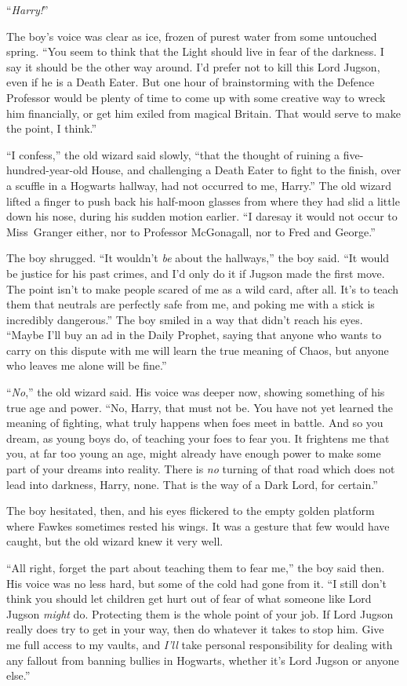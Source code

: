 “\emph{Harry!}”

The boy’s voice was clear as ice, frozen of purest water from some untouched
spring. “You seem to think that the Light should live in fear of the darkness.
I say it should be the other way around. I’d prefer not to kill this Lord
Jugson, even if he is a Death Eater. But one hour of brainstorming with the
Defence Professor would be plenty of time to come up with some creative way to
wreck him financially, or get him exiled from magical Britain. That would serve
to make the point, I think.”

“I confess,” the old wizard said slowly, “that the thought of ruining a
five-hundred-year-old House, and challenging a Death Eater to fight to the
finish, over a scuffle in a Hogwarts hallway, had not occurred to me, Harry.”
The old wizard lifted a finger to push back his half-moon glasses from where
they had slid a little down his nose, during his sudden motion earlier. “I
daresay it would not occur to Miss~Granger either, nor to Professor McGonagall,
nor to Fred and George.”

The boy shrugged. “It wouldn’t \emph{be} about the hallways,” the boy said. “It
would be justice for his past crimes, and I’d only do it if Jugson made the
first move. The point isn’t to make people scared of me as a wild card, after
all. It’s to teach them that neutrals are perfectly safe from me, and poking me
with a stick is incredibly dangerous.” The boy smiled in a way that didn’t
reach his eyes. “Maybe I’ll buy an ad in the Daily Prophet, saying that anyone
who wants to carry on this dispute with me will learn the true meaning of
Chaos, but anyone who leaves me alone will be fine.”

“\emph{No},” the old wizard said. His voice was deeper now, showing something
of his true age and power. “No, Harry, that must not be. You have not yet
learned the meaning of fighting, what truly happens when foes meet in battle.
And so you dream, as young boys do, of teaching your foes to fear you. It
frightens me that you, at far too young an age, might already have enough power
to make some part of your dreams into reality. There is \emph{no} turning of
that road which does not lead into darkness, Harry, none. That is the way of a
Dark Lord, for certain.”

The boy hesitated, then, and his eyes flickered to the empty golden platform
where Fawkes sometimes rested his wings. It was a gesture that few would have
caught, but the old wizard knew it very well.

“All right, forget the part about teaching them to fear me,” the boy said then.
His voice was no less hard, but some of the cold had gone from it. “I still
don’t think you should let children get hurt out of fear of what someone like
Lord Jugson \emph{might} do. Protecting them is the whole point of your job. If
Lord Jugson really does try to get in your way, then do whatever it takes to
stop him. Give me full access to my vaults, and \emph{I’ll} take personal
responsibility for dealing with any fallout from banning bullies in Hogwarts,
whether it’s Lord Jugson or anyone else.”

